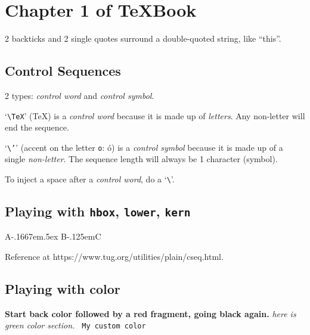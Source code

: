 \documentclass[a4paper, oneside, 12pt, parskip=half]{scrbook}
\begin{document}
\tableofcontents

\chapter{Chapter 1 of TeXBook}

2 backticks and 2 single quotes surround a double-quoted string, like ``this''.

\section{Control Sequences}

2 types: \textit{control word} and \textit{control symbol}.

`\texttt{\textbackslash TeX}' (\TeX) is a \textit{control word} because it is made up of \textit{letters}. Any non-letter will end the sequence.

`\texttt{\textbackslash '}' (accent on the letter \texttt{o}: \'o) is a \textit{control symbol} because it is made up of a single \textit{non-letter}. The sequence length will always be 1 character (symbol).

To inject a space after a \textit{control word}, do a `\texttt{\textbackslash \textvisiblespace}'.

\section{Playing with \texttt{hbox}, \texttt{lower}, \texttt{kern}}

A\kern -.1667em\lower .5ex \hbox {B}\kern -.125emC

Reference at https://www.tug.org/utilities/plain/cseq.html.

\section{Playing with color}

\textbf{Start back color {\color{red}followed by a red fragment}, going black again.} \textit{{\color{green} here is green color section.}} \texttt{\color{mycolor} My custom color}
\end{document}

